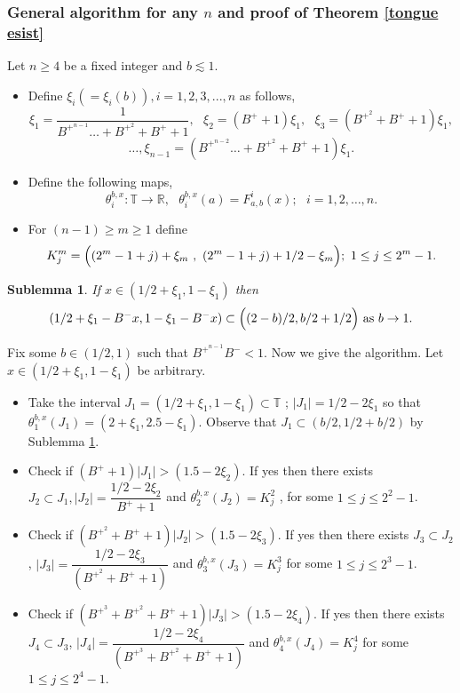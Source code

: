 \documentclass[12pt]{amsart}
\numberwithin{equation}{section}
\newtheorem{sublemma}[theorem]{Sublemma}
\theoremstyle{remark}
\begin{document}
\subsubsection{\textbf{General algorithm for any $n$ and proof of Theorem \ref{tongue esist}}}
\vspace{.3cm}
Let $n \geq 4$ be a fixed integer and $b \lesssim 1$.
 \begin{itemize}
    
    \item Define $\xi_i(=\xi_i(b)), i=1,2,3,...,n$ as follows,  
\[ \xi_1=\dfrac{1}{B^{+^{n-1}}\ldots+B^{+^{2}}+B^++1}, \text{ } \xi_2= (B^++1) \xi_1, \text{ }\xi_3=(B^{+^{2}}+B^++1)\xi_1,\]
 \[\ldots,  \xi_{n-1}=(B^{+^{n-2}}\ldots+B^{+^{2}}+B^++1)\xi_1.
 \]
    \item Define the following maps,
\[
\theta_{i}^{b,x}: \mathbb{T} \to \mathbb{R}, \text{ }\theta_{i}^{b,x}(a)=F_{a,b}^{i}(x); \text{ } i=1,2,\ldots, n.
\]
\item For $(n-1)\geq m \geq 1$ define 
\[
K_j^{m}=\displaystyle\Bigl((2^m-1+j)+\xi_m \text{ }, \text{ }(2^m-1+j)+1/2-\xi_m\Bigr); \text{ }1 \leq j \leq 2^m-1.
\]

\end{itemize}
\begin{sublemma}\label{1st stage range for a}
If $x \in (1/2+\xi_1,1-\xi_1)$ then 
\[
(1/2+\xi_1-B^-x,1-\xi_1-B^-x) \subset \displaystyle\Bigl((2-b)/2,b/2+1/2\Bigr) \text{  as } b \to 1.
\]
 
\end{sublemma}
Fix some  $b\in (1/2,1)$ such that $B^{+^{n-1}}B^{-}<1$. 
Now we give the algorithm. Let $x \in (1/2+\xi_1,1-\xi_1)$ be arbitrary.  
\begin{itemize}
    \item Take the interval  $J_1=(1/2+\xi_1,1-\xi_1) \subset \mathbb{T}$ ; $|J_1|=1/2-2\xi_1$ so that $\theta_1^{b,x}(J_1)=(2+\xi_1,2.5-\xi_1)$. Observe that $J_1 \subset (b/2,1/2+b/2)$ by Sublemma \ref{1st stage range for a}.
    \item Check if $(B^++1)|J_1|>(1.5-2\xi_2)$. If yes
    then there exists $J_2\subset J_1, |J_2|=\dfrac{1/2-2\xi_2}{B^++1}$ and $\theta_2^{b,x}(J_2)=K^2_j$ , for some $1 \leq j \leq 2^2-1$. 
    \item Check if $(B^{+^{2}}+B^++1)|J_2|>(1.5-2\xi_3)$. If yes then there exists $J_3\subset J_2$, $|J_3|=\dfrac{1/2-2\xi_3}{(B^{+^{2}}+B^++1)}$ and $\theta_3^{b,x}(J_3)=K_j^{3}$ for some $1 \leq j \leq 2^3-1$. 
    \item Check if $(B^{+^{3}}+B^{+^{2}}+B^++1)|J_3|>(1.5-2\xi_4)$. If yes then there exists
    \vspace{.2cm}
    $J_4\subset J_3$, $|J_4|=\dfrac{1/2-2\xi_4}{(B^{+^{3}}+B^{+^{2}}+B^++1)}$ and $\theta_4^{b,x}(J_4)=K_j^{4}$ for some $1 \leq j \leq 2^4-1$. 
    \end{itemize}
\end{document}
